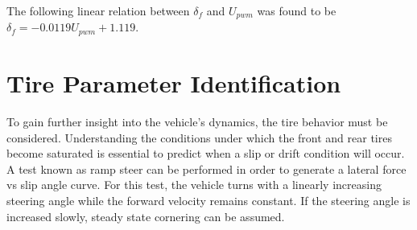 \documentclass{article}
\numberwithin{equation}{section}
\begin{document}
\begin{flushleft}
The following linear relation between $\delta_f$ and $U_{pwm}$ was found to be $\delta_f = -0.0119U_{pwm} + 1.119$.
\end{flushleft}

\section{Tire Parameter Identification}

To gain further insight into the vehicle's dynamics, the tire behavior must be considered. Understanding the conditions under which the front and rear tires become saturated is essential to predict when a slip or drift condition will occur. A test known as ramp steer can be performed in order to generate a lateral force vs slip angle curve. For this test, the vehicle turns with a linearly increasing steering angle while the forward velocity remains constant. If the steering angle is increased slowly, steady state cornering can be assumed. 
\end{document}
